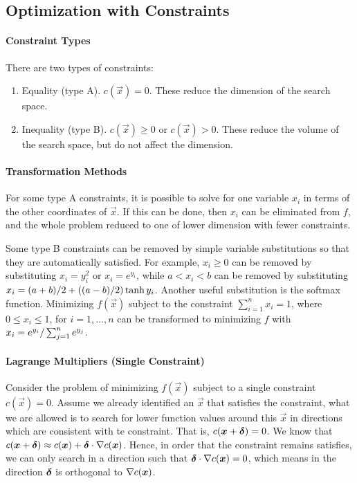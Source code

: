 \subsection{Optimization with Constraints}

\paragraph{Constraint Types}

There are two types of constraints:
\begin{enumerate}
	\item Equality (type A). $c(\vec{x})=0$. These reduce the dimension of the search space.
	\item Inequality (type B). $c(\vec{x})\geq0$ or $c(\vec{x})>0$. These reduce the volume of the search space, but do not affect the dimension.
\end{enumerate}

\paragraph{Transformation Methods}

For some type A constraints, it is possible to solve for one variable $x_i$ in terms of the other coordinates of $\vec{x}$. If this can be done, then $x_i$ can be eliminated from $f$, and the whole problem reduced to one of lower dimension with fewer constraints.

Some type B constraints can be removed by simple variable substitutions so that they are automatically satisfied. For example, $x_i\geq0$ can be removed by substituting $x_i=y_i^2$ or $x_i=e^{y_i}$, while $a<x_i<b$ can be removed by substituting $x_i=(a+b)/2+\left((a-b)/2\right)\tanh y_i$. Another useful substitution is the softmax function. Minimizing $f(\vec{x})$ subject to the constraint $\sum_{i=1}^nx_i=1$, where $0\leq x_i\leq1$, for $i=1,\dotsc,n$ can be transformed to minimizing $f$ with $x_i=e^{y_i}/\sum_{j=1}^ne^{y_j}$.

\paragraph{Lagrange Multipliers (Single Constraint)}

Consider the problem of minimizing $f(\vec{x})$ subject to a single constraint $c(\vec{x})=0$. Assume we already identified an $\vec{x}$ that satisfies the constraint, what we are allowed is to search for lower function values around this $\vec{x}$ in directions which are consistent with te constraint. That is, $c(\boldsymbol{x}+\boldsymbol{\delta})=0$. We know that $c(\boldsymbol{x}+\boldsymbol{\delta})\approx c(\boldsymbol{x})+\boldsymbol{\delta}\cdot\nabla c(\boldsymbol{x})$. Hence, in order that the constraint remains satisfies, we can only search in a direction such that $\boldsymbol{\delta}\cdot\nabla c(\boldsymbol{x})=0$, which means in the direction $\boldsymbol{\delta}$ is orthogonal to $\nabla c(\boldsymbol{x})$.

